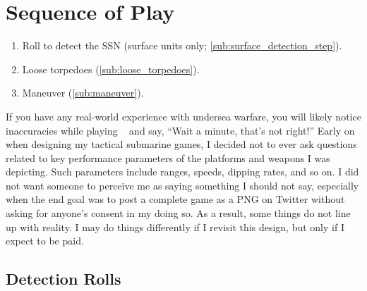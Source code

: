 \documentclass[../TacSubMicroRules.tex]{subfiles}
\begin{document}
\section{Sequence of Play}%
\label{sec:sequence_of_play}

\begin{enumerate}
    \item Roll to detect the SSN (surface units only; \ref{sub:surface_detection_step}).
    \item Loose torpedoes (\ref{sub:loose_torpedoes}).
    \item Maneuver (\ref{sub:maneuver}).
\end{enumerate}

\begin{design}
    If you have any real-world experience with undersea warfare, you will likely notice inaccuracies while playing \gametitle~ and say, ``Wait a minute, that's not right!''
    Early on when designing my tactical submarine games, I decided not to ever ask questions related to key performance parameters of the platforms and weapons I was depicting.
    Such parameters include ranges, speeds, dipping rates, and so on.
    I did not want someone to perceive me as saying something I should not say, especially when the end goal was to post a complete game as a PNG on Twitter without asking for anyone's consent in my doing so.
    As a result, some things do not line up with reality.
    I may do things differently if I revisit this design, but only if I expect to be paid.
\end{design}

\subsection{Detection Rolls}%
\label{sub:detection_rolls}

\end{document}
